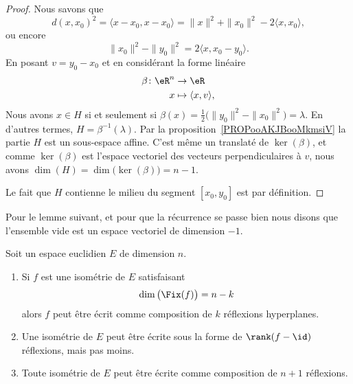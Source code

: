 \begin{proof}
	Nous savons que
	\begin{equation}
		d(x,x_0)^2=\langle x-x_0, x-x_0\rangle =\| x \|^2+\| x_0 \|^2-2\langle x, x_0\rangle,
	\end{equation}
	ou encore
	\begin{equation}
		\| x_0 \|^2-\| y_0 \|^2=2\langle x, x_0-y_0\rangle .
	\end{equation}
	En posant \( v=y_0-x_0\) et en considérant la forme linéaire
	\begin{equation}
		\begin{aligned}
			\beta\colon \eR^n & \to \eR                       \\
			x                 & \mapsto \langle x, v\rangle ,
		\end{aligned}
	\end{equation}
	Nous avons \( x\in H\) si et seulement si \( \beta(x)=\frac{ 1 }{2}\big( \| y_0 \|^2-\| x_0 \|^2 \big)=\lambda\). En d'autres termes, \( H=\beta^{-1}(\lambda)\). Par la proposition~\ref{PROPooAKJBooMkmsiV} la partie \( H\) est un sous-espace affine. C'est même un translaté de \( \ker(\beta)\), et comme \( \ker(\beta)\) est l'espace vectoriel des vecteurs perpendiculaires à \( v\), nous avons \( \dim(H)=\dim\big( \ker(\beta) \big)=n-1\).

	Le fait que \( H\) contienne le milieu du segment \( [x_0,y_0]\) est par définition.
\end{proof}

Pour le lemme suivant, et pour que la récurrence se passe bien nous disons que l'ensemble vide est un espace vectoriel de dimension \( -1\).
\begin{lemma}       \label{LEMooJCDRooGAmlwp}
	Soit un espace euclidien \( E\) de dimension \( n\).
	\begin{enumerate}
		\item       \label{ITEMooFYEDooIJZBjP}
		      Si \( f\) est une isométrie de \( E\) satisfaisant
		      \begin{equation}
			      \dim\big( \Fix(f) \big)=n-k
		      \end{equation}
		      alors \( f\) peut être écrit comme composition de \( k\) réflexions hyperplanes.
		\item       \label{ITEMooJTZVooWvyfDD}
		      Une isométrie de \( E\) peut être écrite sous la forme de \( \rank(f-\id)\) réflexions, mais pas moins.
		\item       \label{ITEMooUCZWooSbyPwt}
		      Toute isométrie de \( E\) peut être écrite comme composition de \( n+1\) réflexions.
	\end{enumerate}
\end{lemma}

